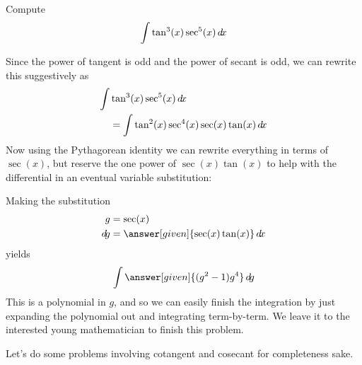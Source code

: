 \documentclass{ximera}
\begin{document}
\begin{example}
  Compute
  \[
  \int \tan^3(x) \sec^5(x) \mathop{}\!d\! x
  \]
  \begin{explanation}
    Since the power of tangent is odd and the power of secant is odd,
    we can rewrite this suggestively as
    \begin{align*}
    \int &\tan^3(x) \sec^5(x) \mathop{}\!d\! x \\
    &= \int\tan^2(x) \sec^4(x) \sec(x)\tan(x) \mathop{}\!d\! x
    \end{align*}
    Now using the Pythagorean identity we can rewrite everything in
    terms of $\sec(x)$, but reserve the one power of $\sec(x)\tan(x)$ to help
    with the differential in an eventual variable substitution:
    \begin{center}%
    \end{center}
    Making the substitution
    \begin{align*}
      g &= \sec(x)\\
      \d g &=\answer[given]{\sec(x)\tan(x)} \d x
    \end{align*}
    yields
    \[
    \int \answer[given]{(g^2-1)g^4} \d g
    \]
    This is a polynomial in $g$, and so we can easily finish the
    integration by just expanding the polynomial out and integrating
    term-by-term. We leave it to the interested young mathematician to
    finish this problem.
  \end{explanation}
\end{example}


Let's do some problems involving cotangent and cosecant for
completeness sake.
\end{document}
